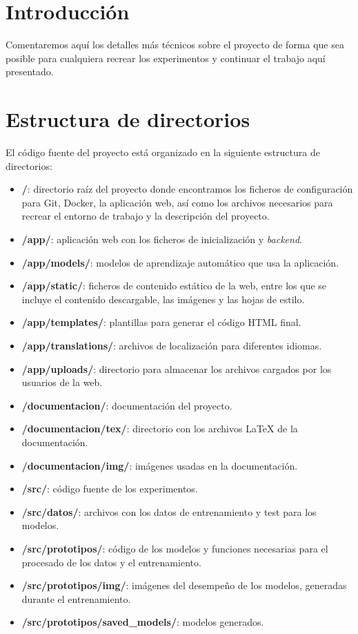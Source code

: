 
\section{Introducción}

Comentaremos aquí los detalles más técnicos sobre el proyecto de forma que sea posible para cualquiera recrear los experimentos y continuar el trabajo aquí presentado.

\section{Estructura de directorios}

El código fuente del proyecto está organizado en la siguiente estructura de directorios:

\begin{itemize}
    \item \textbf{/}: directorio raíz del proyecto donde encontramos los ficheros de configuración para Git, Docker, la aplicación web, así como los archivos necesarios para recrear el entorno de trabajo y la descripción del proyecto.
    \item \textbf{/app/}: aplicación web con los ficheros de inicialización y \textit{backend}.
    \item \textbf{/app/models/}: modelos de aprendizaje automático que usa la aplicación.
    \item \textbf{/app/static/}: ficheros de contenido estático de la web, entre los que se incluye el contenido descargable, las imágenes y las hojas de estilo.    
    \item \textbf{/app/templates/}: plantillas para generar el código HTML final.
    \item \textbf{/app/translations/}: archivos de localización para diferentes idiomas.
    \item \textbf{/app/uploads/}: directorio para almacenar los archivos cargados por los usuarios de la web.
    \item \textbf{/documentacion/}: documentación del proyecto.
    \item \textbf{/documentacion/tex/}: directorio con los archivos LaTeX de la documentación.
    \item \textbf{/documentacion/img/}: imágenes usadas en la documentación.
    \item \textbf{/src/}: código fuente de los experimentos.
    \item \textbf{/src/datos/}: archivos con los datos de entrenamiento y test para los modelos.
    \item \textbf{/src/prototipos/}: código de los modelos y funciones necesarias para el procesado de los datos y el entrenamiento.
    \item \textbf{/src/prototipos/img/}: imágenes del desempeño de los modelos, generadas durante el entrenamiento.
    \item \textbf{/src/prototipos/saved\_models/}: modelos generados.
\end{itemize}

